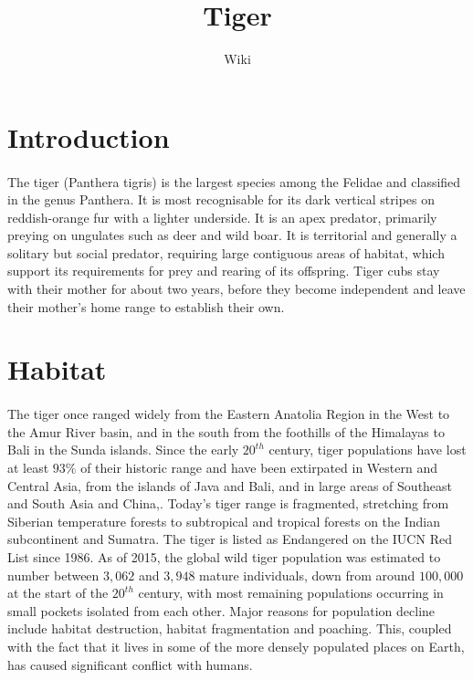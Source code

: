 \documentclass[12pt]{article}
\title{Tiger}
\author{Wiki}
\date{}
\begin{document}
	\maketitle
	\tableofcontents
	\pagebreak
	
	\section{Introduction}
	\paragraph{}
	The tiger  (Panthera tigris)  is the largest species among the Felidae and classified in the genus Panthera. It is most recognisable for its dark vertical stripes on reddish-orange fur with a lighter underside. It is an apex predator, primarily preying on ungulates such as deer and wild boar. It is territorial and generally a solitary but social predator, requiring large contiguous areas of habitat, which support its requirements for prey and rearing of its offspring. Tiger cubs stay with their mother for about two years, before they become independent and leave their mother's home range to establish their own.
	
	\section{Habitat}
	\paragraph{}
	The tiger once ranged widely from the Eastern Anatolia Region in the West to the Amur River basin, and in the south from the foothills of the Himalayas to Bali in the Sunda islands. Since the early $20^{th}$ century, tiger populations have lost at least $93\%$ of their historic range and have been extirpated in Western and Central Asia, from the islands of Java and Bali, and in large areas of Southeast and South Asia and China,. Today's tiger range is fragmented, stretching from Siberian temperature forests to subtropical and tropical forests on the Indian subcontinent and Sumatra. The tiger is listed as Endangered on the IUCN Red List since 1986. As of 2015, the global wild tiger population was estimated to number between $3,062$ and $3,948$ mature individuals, down from around $100,000$ at the start of the $20^{th}$ century, with most remaining populations occurring in small pockets isolated from each other. Major reasons for population decline include habitat destruction, habitat fragmentation and poaching. This, coupled with the fact that it lives in some of the more densely populated places on Earth, has caused significant conflict with humans.
	
\end{document}
